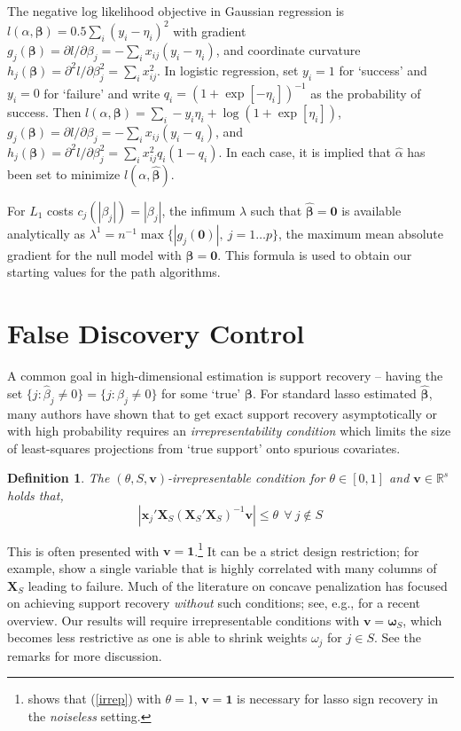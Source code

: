 \documentclass[12pt]{article}
\newtheorem{definition}{\sc Definition}[section]
\newcommand{\bs}[1]{\boldsymbol{#1}}
\newcommand{\bm}[1]{\mathbf{#1}}
\newcommand{\ds}[1]{\mathds{#1}}
\begin{document}
The negative log likelihood objective in Gaussian regression is $
l(\alpha,\bs{\beta}) = 0.5\sum_i (y_i -\eta_i)^2 $ with gradient
$g_j(\bs{\beta}) = \partial l/\partial \beta_j = -\sum_i x_{ij}(y_i -
\eta_i)$, and coordinate curvature $h_j(\bs{\beta}) = \partial^2 l/\partial
\beta_j^2 = \sum_i x_{ij}^2$. In logistic regression, set $y_i = 1$ for
`success' and $y_i = 0$ for `failure' and write $q_i = (1 +
\exp[-\eta_i])^{-1}$ as the probability of success.  Then
$l(\alpha,\bs{\beta}) = \sum_i -y_i\eta_i + \log(1 +
  \exp[\eta_i])$,
$
g_j(\bs{\beta}) = \partial l/\partial \beta_j = -\sum_i
x_{ij}(y_i - q_i)$, and
$h_j(\bs{\beta}) = \partial^2 l/\partial \beta_j^2 = \sum_i
x_{ij}^2q_i(1-q_i)
$.
In each case, it is implied that $\hat\alpha$ has been set
to minimize $l(\alpha,\bs{\hat\beta})$. 

For $L_1$ costs $c_j(|\beta_j|) = |\beta_j|$, the infimum $\lambda$ such
that $\bs{\hat\beta} = \bm{0}$ is  available analytically as
$\lambda^1 =
n^{-1}\max\{|g_j(\bm{0})|,~j=1\ldots p\}$, the maximum mean
absolute gradient for the null model with $\bs{\beta} = \bm{0}$.  This formula
is used to obtain our starting values for the path algorithms.


\section{False Discovery Control}

A common goal in high-dimensional estimation is  support recovery -- having the set $\{j: \hat\beta_j \neq 0\} = \{j: \beta_j \neq 0\}$ for some `true' $\bs{\beta}$.
For standard lasso estimated $\bs{\hat\beta}$, many authors have shown \citep[e.g.,][]{buhlmann_statistics_2011,zou_adaptive_2006} that to get exact support recovery asymptotically or with high probability requires an {\it irrepresentability condition} which limits the size of least-squares projections from `true support' onto spurious covariates.  
\begin{definition} 
The $(\theta,S,\bm{v})$-irrepresentable condition for $\theta\in[0,1]$ and $\bm{v}\in \ds{R}^s$ holds that, 
\begin{equation}\label{irrep}
|\bs{x}_j'\bm{X}_S(\bm{X}_S'\bm{X}_S)^{-1}\bm{v}| \leq \theta ~~\forall~j\notin S
\end{equation}
\end{definition}
\noindent This is often presented with $\bm{v}=\bm{1}$.\footnote{\cite{wainwright_sharp_2009} shows that (\ref{irrep}) with $\theta=1$, $\bm{v}=\bm{1}$ is necessary for lasso sign recovery in the {\it noiseless} setting.} It
can be a strict design restriction; for example,
\citet{buhlmann_statistics_2011} show a single variable that is
highly correlated with many columns of $\bm{X}_S$ leading to failure. Much
of the literature on concave penalization has focused on achieving
support recovery {\it without} such conditions; see, e.g.,
\cite{fan_strong_2014} for a recent overview.  
Our results will require irrepresentable conditions with $\bm{v} =
\bs{\omega}_S$, which becomes less restrictive as one is able to shrink
weights $\omega_j$ for $j\in S$.  See the remarks for more discussion.
\end{document}
